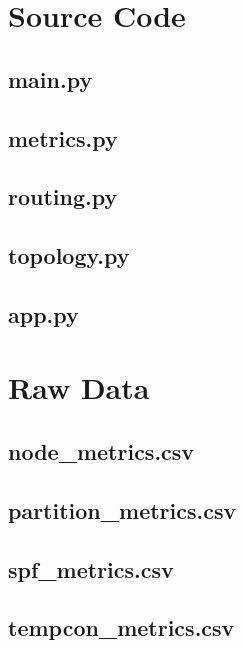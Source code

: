 \documentclass[12pt]{article}
\begin{document}
\appendix
\section{Source Code}
\subsection{main.py}


\subsection{metrics.py}


\subsection{routing.py}


\subsection{topology.py}


\subsection{app.py}


\section{Raw Data}
\subsection{node\_metrics.csv}


\subsection{partition\_metrics.csv}


\subsection{spf\_metrics.csv}


\subsection{tempcon\_metrics.csv}

\end{document}
